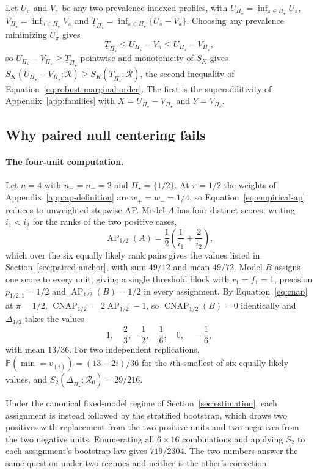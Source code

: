 \documentclass[11pt]{article}
\newcommand{\AP}{\operatorname{AP}}
\newcommand{\CNAP}{\operatorname{CNAP}}
\newcommand{\Regime}{\mathcal{R}}
\newcommand{\PSet}{\Pi_\star}
\newcommand{\Prb}{\mathbb{P}}
\newcommand{\RobDelta}{\underline{\Delta}_{\PSet}}
\theoremstyle{remark}
\begin{document}
Let $U_\pi$ and $V_\pi$ be any two prevalence-indexed profiles, with $U_{\PSet}=\inf_{\pi\in\PSet}U_\pi$, $V_{\PSet}=\inf_{\pi\in\PSet}V_\pi$ and $\underline{T}_{\PSet}=\inf_{\pi\in\PSet}\{U_\pi-V_\pi\}$. Choosing any prevalence minimizing $U_\pi$ gives
\[
\underline{T}_{\PSet}
\leq
U_{\PSet}-V_\pi
\leq
U_{\PSet}-V_{\PSet},
\]
so $U_{\PSet}-V_{\PSet}\geq\underline{T}_{\PSet}$ pointwise and monotonicity of $S_K$ gives $S_K(U_{\PSet}-V_{\PSet};\Regime)\geq S_K(\underline{T}_{\PSet};\Regime)$, the second inequality of Equation~\eqref{eq:robust-marginal-order}. The first is the superadditivity of Appendix~\ref{app:families} with $X=U_{\PSet}-V_{\PSet}$ and $Y=V_{\PSet}$.

\subsection{Why paired null centering fails}
\label{app:paired-null}

\paragraph{The four-unit computation.}
Let $n=4$ with $n_+=n_-=2$ and $\PSet=\{1/2\}$. At $\pi=1/2$ the weights of Appendix~\ref{app:ap-definition} are $w_+=w_-=1/4$, so Equation~\eqref{eq:empirical-ap} reduces to unweighted stepwise AP. Model $A$ has four distinct scores; writing $i_1<i_2$ for the ranks of the two positive cases,
\[
\AP_{1/2}(A)
=
\frac12
\left(
\frac{1}{i_1}+\frac{2}{i_2}
\right),
\]
which over the six equally likely rank pairs gives the values listed in Section~\ref{sec:paired-anchor}, with sum $49/12$ and mean $49/72$. Model $B$ assigns one score to every unit, giving a single threshold block with $r_1=f_1=1$, precision $p_{1/2,1}=1/2$ and $\AP_{1/2}(B)=1/2$ in every assignment. By Equation~\eqref{eq:cnap} at $\pi=1/2$, $\CNAP_{1/2}=2\AP_{1/2}-1$, so $\CNAP_{1/2}(B)=0$ identically and $\Delta_{1/2}$ takes the values
\[
1,\quad
\frac23,\quad
\frac12,\quad
\frac16,\quad
0,\quad
-\frac16 ,
\]
with mean $13/36$. For two independent replications, $\Prb(\min=v_{(i)})=(13-2i)/36$ for the $i$th smallest of six equally likely values, and $S_2(\RobDelta;\Regime_0)=29/216$.

Under the canonical fixed-model regime of Section~\ref{sec:estimation}, each assignment is instead followed by the stratified bootstrap, which draws two positives with replacement from the two positive units and two negatives from the two negative units. Enumerating all $6\times16$ combinations and applying $S_2$ to each assignment's bootstrap law gives $719/2304$. The two numbers answer the same question under two regimes and neither is the other's correction.
\end{document}

